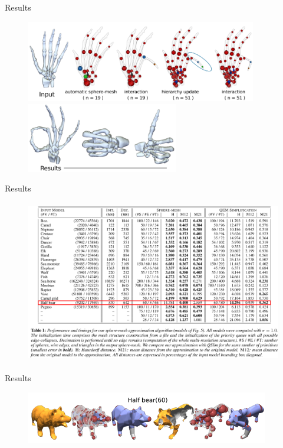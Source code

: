 \documentclass{beamer}
\begin{document}
\begin{frame}{Results}
\begin{figure}
\includegraphics[height=1.4in]{./img/deformation.png}\\
\includegraphics[height=1.2in]{./img/deformation2.png}
\end{figure}
\end{frame}

\begin{frame}{Results}
\begin{figure}
\vspace{-10mm}
\hspace{-8mm}
\includegraphics[height=2.8in]{./img/data.png}
\end{figure}
\end{frame}

\begin{frame}{Results}
\begin{figure}[!htb]
\centering
\includegraphics[height=0.9in]{./img/half-bear.png}
\end{figure}
\end{frame}
\end{document}
